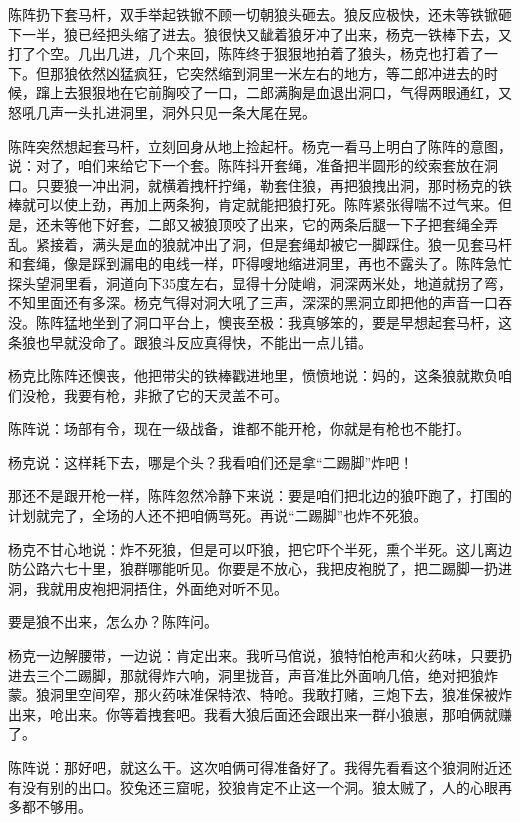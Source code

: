 \par 陈阵扔下套马杆，双手举起铁锨不顾一切朝狼头砸去。狼反应极快，还未等铁锨砸下一半，狼已经把头缩了进去。狼很快又龇着狼牙冲了出来，杨克一铁棒下去，又打了个空。几出几进，几个来回，陈阵终于狠狠地拍着了狼头，杨克也打着了一下。但那狼依然凶猛疯狂，它突然缩到洞里一米左右的地方，等二郎冲进去的时候，蹿上去狠狠地在它前胸咬了一口，二郎满胸是血退出洞口，气得两眼通红，又怒吼几声一头扎进洞里，洞外只见一条大尾在晃。
\par 陈阵突然想起套马杆，立刻回身从地上捡起杆。杨克一看马上明白了陈阵的意图，说：对了，咱们来给它下一个套。陈阵抖开套绳，准备把半圆形的绞索套放在洞口。只要狼一冲出洞，就横着拽杆拧绳，勒套住狼，再把狼拽出洞，那时杨克的铁棒就可以使上劲，再加上两条狗，肯定就能把狼打死。陈阵紧张得喘不过气来。但是，还未等他下好套，二郎又被狼顶咬了出来，它的两条后腿一下子把套绳全弄乱。紧接着，满头是血的狼就冲出了洞，但是套绳却被它一脚踩住。狼一见套马杆和套绳，像是踩到漏电的电线一样，吓得嗖地缩进洞里，再也不露头了。陈阵急忙探头望洞里看，洞道向下35度左右，显得十分陡峭，洞深两米处，地道就拐了弯，不知里面还有多深。杨克气得对洞大吼了三声，深深的黑洞立即把他的声音一口吞没。陈阵猛地坐到了洞口平台上，懊丧至极：我真够笨的，要是早想起套马杆，这条狼也早就没命了。跟狼斗反应真得快，不能出一点儿错。
\par 杨克比陈阵还懊丧，他把带尖的铁棒戳进地里，愤愤地说：妈的，这条狼就欺负咱们没枪，我要有枪，非掀了它的天灵盖不可。
\par 陈阵说：场部有令，现在一级战备，谁都不能开枪，你就是有枪也不能打。
\par 杨克说：这样耗下去，哪是个头？我看咱们还是拿“二踢脚”炸吧！
\par 那还不是跟开枪一样，陈阵忽然冷静下来说：要是咱们把北边的狼吓跑了，打围的计划就完了，全场的人还不把咱俩骂死。再说“二踢脚”也炸不死狼。
\par 杨克不甘心地说：炸不死狼，但是可以吓狼，把它吓个半死，熏个半死。这儿离边防公路六七十里，狼群哪能听见。你要是不放心，我把皮袍脱了，把二踢脚一扔进洞，我就用皮袍把洞捂住，外面绝对听不见。
\par 要是狼不出来，怎么办？陈阵问。
\par 杨克一边解腰带，一边说：肯定出来。我听马倌说，狼特怕枪声和火药味，只要扔进去三个二踢脚，那就得炸六响，洞里拢音，声音准比外面响几倍，绝对把狼炸蒙。狼洞里空间窄，那火药味准保特浓、特呛。我敢打赌，三炮下去，狼准保被炸出来，呛出来。你等着拽套吧。我看大狼后面还会跟出来一群小狼崽，那咱俩就赚了。
\par 陈阵说：那好吧，就这么干。这次咱俩可得准备好了。我得先看看这个狼洞附近还有没有别的出口。狡兔还三窟呢，狡狼肯定不止这一个洞。狼太贼了，人的心眼再多都不够用。
